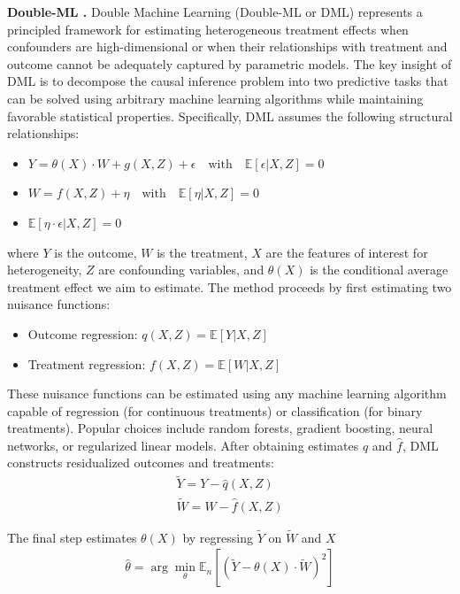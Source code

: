 \textbf{Double-ML \citep{chernozhukov2018double}.} Double Machine Learning (Double-ML or DML) represents a principled framework for estimating heterogeneous treatment effects when confounders are high-dimensional or when their relationships with treatment and outcome cannot be adequately captured by parametric models. The key insight of DML is to decompose the causal inference problem into two predictive tasks that can be solved using arbitrary machine learning algorithms while maintaining favorable statistical properties. Specifically, DML assumes the following structural relationships:
\begin{itemize}
    \item $Y = \theta(X) \cdot W + g(X, Z) + \epsilon \quad \text{with} \quad \mathbb{E}[\epsilon | X, Z] = 0$
    \item $W = f(X, Z) + \eta \quad \text{with} \quad \mathbb{E}[\eta | X, Z] = 0$
    \item $\mathbb{E}[\eta \cdot \epsilon | X, Z] = 0$
\end{itemize}
where $Y$ is the outcome, $W$ is the treatment, $X$ are the features of interest for heterogeneity, $Z$ are confounding variables, and $\theta(X)$ is the conditional average treatment effect we aim to estimate.
The method proceeds by first estimating two nuisance functions:
\begin{itemize}
    \item Outcome regression: $q(X, Z) = \mathbb{E}[Y | X, Z]$
    \item Treatment regression: $f(X, Z) = \mathbb{E}[W | X, Z]$
\end{itemize}
These nuisance functions can be estimated using any machine learning algorithm capable of regression (for continuous treatments) or classification (for binary treatments).
Popular choices include random forests, gradient boosting, neural networks, or regularized linear models.
After obtaining estimates $\hat{q}$ and $\hat{f}$, DML constructs residualized outcomes and treatments:
\begin{align*}
    \tilde{Y} = Y - \hat{q}(X, Z)\\
    \tilde{W} = W - \hat{f}(X, Z)
\end{align*}

The final step estimates $\theta(X)$ by regressing $\tilde{Y}$ on $\tilde{W}$ and $X$
\begin{align*}
    \hat{\theta} = \arg\min_{\theta} \mathbb{E}_n[(\tilde{Y} - \theta(X) \cdot \tilde{W})^2]    
\end{align*}


